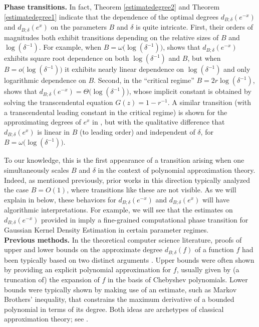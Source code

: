  \textbf{Phase transitions.} In fact, Theorem \ref{estimatedegree2} and Theorem \ref{estimatedegree1} indicate that the dependence of the optimal degrees $d_{B; \delta} (e^{-x})$ and $d_{B; \delta} (e^{x})$ on the parameters $B$ and $\delta$ is quite intricate. First, their orders of magnitudes both exhibit transitions depending on the relative sizes of $B$ and $\log (\delta^{-1})$. For example, when $B = \omega \big( \log (\delta^{-1}) \big)$,  shows that $d_{B; \delta} (e^{-x})$ exhibits square root dependence on both $\log (\delta^{-1})$ and $B$, but when $B = o \big( \log (\delta^{-1}) \big)$ it exhibits nearly linear dependence on $\log (\delta^{-1})$ and only logarithmic dependence on $B$. Second, in the ``critical regime'' $B = 2r \log (\delta^{-1})$,  shows that $d_{B; \delta} (e^{-x}) = \Theta \big( \log (\delta^{-1}) \big)$, whose implicit constant is obtained by solving the transcendental equation $G(z) = 1 - r^{-1}$. A similar transition (with a transcendental leading constant in the critical regime) is shown for the approximating degrees of $e^x$ in , but with the qualitative difference that $d_{B; \delta} (e^x)$ is linear in $B$ (to leading order) and independent of $\delta$, for $B = \omega \big( \log (\delta^{-1}) \big)$. 

To our knowledge, this is the first appearance of a transition arising when one simultaneously scales $B$ and $\delta$ in the context of polynomial approximation theory. Indeed, as mentioned previously, prior works in this direction typically analyzed the case $B = O (1)$, where transitions like these are not visible. As we will explain in  below, these behaviors for $d_{B; \delta} (e^{-x})$ and  $d_{B; \delta} (e^{x})$ will have algorithmic interpretations. For example, we will see that the estimates on  $d_{B; \delta} (e^{-x})$ provided in  imply a fine-grained computational phase transition for Gaussian Kernel Density Estimation in certain parameter regimes. \\


\textbf{Previous methods.} In the theoretical computer science literature, proofs of upper and lower bounds on the approximate degree $d_{B; \delta} (f)$ of a function $f$ had been typically based on two distinct arguments \cite{nisan1994degree,shi2002approximating, aaronson2004quantum, ambainis2005polynomial, orecchia2012approximating, sachdeva2014faster, bun2015dual}.  Upper bounds were often shown by providing an explicit polynomial approximation for $f$, usually given by (a truncation of) the expansion of $f$ in the basis of Chebyshev polynomials. Lower bounds were typically shown by making use of an estimate, such as Markov Brothers' inequality, that constrains the maximum derivative of a bounded polynomial in terms of its degree. Both ideas are archetypes of classical approximation theory; see \cite[{Chapters 2 and 4}]{TAFRV}. \\


